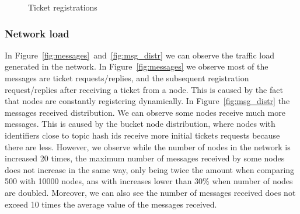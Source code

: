 \begin{figure}[!h]
\centering
{} 
\hspace{-0.25cm}
 \caption{Ticket registrations} 
\label{fig:registrations}
\vspace{-0.15in}
\end{figure}   


\subsubsection{Network load}

In Figure~\ref{fig:messages}~and~\ref{fig:msg_distr} we can observe the traffic load generated in the network.
In Figure~\ref{fig:messages} we observe most of the messages are ticket requests/replies, and the subsequent registration request/replies
after receiving a ticket from a node. 
This is caused by the fact that nodes are constantly registering dynamically. 
In Figure~\ref{fig:msg_distr} the messages received distribution. 
We can observe some nodes receive much more messages.
This is caused by the bucket node distribution, where nodes with identifiers close to topic hash ids receive more initial tickets requests because there are less.
However, we observe while the number of nodes in the network is increased 20 times,  the  maximum number of messages received by some nodes does not increase in the same way,  only being twice the amount when comparing 500 with 10000 nodes,  ans with increases lower than 30\% when number of nodes are doubled.
Moreover,  we can also see the number of messages received does not exceed 10 times the average value of the messages received. 

